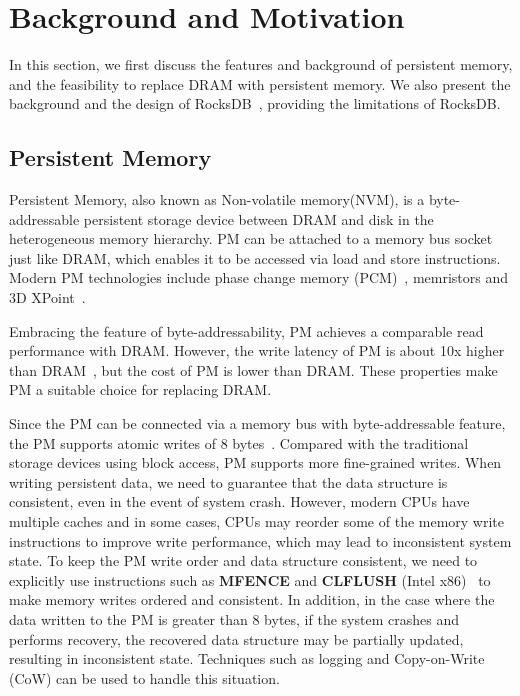 \section{Background and Motivation}
In this section, we first discuss the features and background of persistent memory, and the feasibility to replace DRAM with persistent memory. We also present the background and the design of RocksDB~\cite{RocksDB}, providing the limitations of RocksDB.
\subsection{Persistent Memory}
Persistent Memory, also known as Non-volatile memory(NVM), is a byte-addressable persistent storage device between DRAM and disk in the heterogeneous memory hierarchy. PM can be attached to a memory bus socket just like DRAM, which enables it to be accessed via load and store instructions. Modern PM technologies include phase change memory (PCM)~\cite{PCM}, memristors and 3D XPoint~\cite{3DXPoint}.

Embracing the feature of byte-addressability, PM achieves a comparable read performance with DRAM. However, the write latency of PM is about 10x higher than DRAM~\cite{DBLP:conf/usenix/XiaJXS17}, but the cost of PM is lower than DRAM. These properties make PM a suitable choice for replacing DRAM.

Since the PM can be connected via a memory bus with byte-addressable feature, the PM supports atomic writes of 8 bytes~\cite{DBLP:conf/fast/LeeLSNN17}. Compared with the traditional storage devices using block access, PM supports more fine-grained writes. When writing persistent data, we need to guarantee that the data structure is consistent, even in the event of system crash. However, modern CPUs have multiple caches and in some cases, CPUs may reorder some of the memory write instructions to improve write performance, which may lead to inconsistent system state. To keep the PM write order and data structure consistent, we need to explicitly use instructions such as \textbf{MFENCE} and \textbf{CLFLUSH} (Intel x86)~\cite{SLMDB,DBLP:conf/fast/LeeLSNN17,DBLP:conf/usenix/KannanBGAA18} to make memory writes ordered and consistent. In addition, in the case where the data written to the PM is greater than 8 bytes, if the system crashes and performs recovery, the recovered data structure may be partially updated, resulting in inconsistent state. Techniques such as logging and Copy-on-Write (CoW) can be used to handle this situation.


